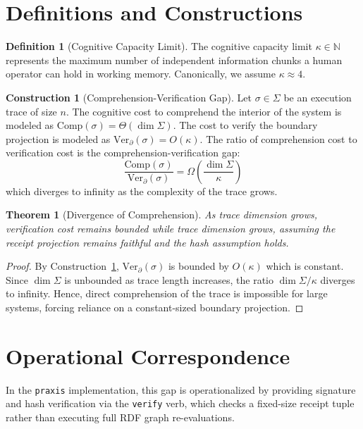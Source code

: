 \documentclass[11pt,oneside]{book}
\theoremstyle{definition}
\newtheorem{definition}{Definition}[chapter]
\newtheorem{construction}{Construction}[chapter]
\theoremstyle{plain}
\newtheorem{theorem}{Theorem}[chapter]
\theoremstyle{remark}
\newcommand{\code}[1]{\texttt{#1}}
\begin{document}
\section{Definitions and Constructions}

\begin{definition}[Cognitive Capacity Limit]\label{def:cognitive_limit}
The cognitive capacity limit $\kappa \in \mathbb{N}$ represents the maximum number of independent information chunks a human operator can hold in working memory. %
Canonically, we assume $\kappa \approx 4$. %
\end{definition}

\begin{construction}[Comprehension-Verification Gap]\label{con:verification_gap}
Let $\sigma \in \Sigma$ be an execution trace of size $n$. %
The cognitive cost to comprehend the interior of the system is modeled as $\mathrm{Comp}(\sigma) = \Theta(\dim \Sigma)$. %
The cost to verify the boundary projection is modeled as $\mathrm{Ver}_{\partial}(\sigma) = O(\kappa)$. %
The ratio of comprehension cost to verification cost is the comprehension-verification gap:
\[
\frac{\mathrm{Comp}(\sigma)}{\mathrm{Ver}_{\partial}(\sigma)} = \Omega\left(\frac{\dim \Sigma}{\kappa}\right)
\]
which diverges to infinity as the complexity of the trace grows. %
\end{construction}

\begin{theorem}[Divergence of Comprehension]\label{thm:comp_diverge}
As trace dimension grows, verification cost remains bounded while trace dimension grows, assuming the receipt projection remains faithful and the hash assumption holds. %
\end{theorem}

\begin{proof}
By Construction~\ref{con:verification_gap}, $\mathrm{Ver}_{\partial}(\sigma)$ is bounded by $O(\kappa)$ which is constant. %
Since $\dim \Sigma$ is unbounded as trace length increases, the ratio $\dim \Sigma / \kappa$ diverges to infinity. %
Hence, direct comprehension of the trace is impossible for large systems, forcing reliance on a constant-sized boundary projection. %
\end{proof}

\section{Operational Correspondence}
In the \code{praxis} implementation, this gap is operationalized by providing signature and hash verification via the \code{verify} verb, which checks a fixed-size receipt tuple rather than executing full RDF graph re-evaluations. %
\end{document}
